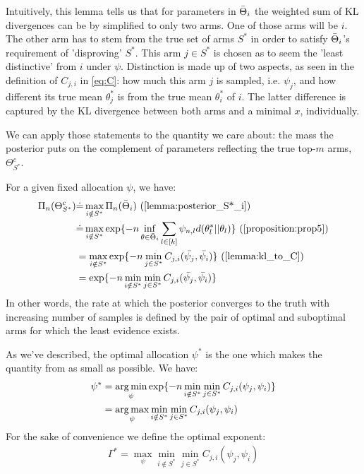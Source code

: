 Intuitively, this lemma tells us that for parameters in $\Bar{\Theta}_i$ the
weighted sum of KL divergences can be by simplified to only two arms. One of
those arms will be $i$. The other arm has to stem from the true set of arms
$S^*$ in order to satisfy $\Bar{\Theta}_i$'s requirement of 'disproving' $S^*$.
This arm $j \in S^*$ is chosen as to seem the 'least distinctive' from $i$ under
$\psi$. Distinction is made up of two aspects, as seen in the definition of
$C_{j, i}$ in \eqref{eq:C}: how much this arm $j$ is sampled, i.e. $\psi_j$, and
how different its true mean $\theta^*_j$ is from the true mean $\theta^*_i$ of
$i$. The latter difference is captured by the KL divergence between both arms
and a minimal $x$, individually.

We can apply those statements to the quantity we care about: the mass the
posterior puts on the complement of parameters reflecting the true top-$m$ arms,
$\Theta_{S^*}^c$.

For a given fixed allocation $\psi$, we have:
\begin{align}
  \Pi_n(\Theta_{S^*}^c) &\deq \max_{i \notin S^*}\Pi_n(\bar{\Theta}_i) \text{ (\Cref{lemma:posterior_S*_i})}\\
    &\deq \max_{i \notin S^*} \exp\{-n\inf_{\theta \in \bar{\Theta}_i} \sum_{l
        \in [k]} \psi_{n, l} d(\theta^*_l || \theta_l)\} \text{
        (\Cref{proposition:prop5})} \\
    &= \max_{i \notin S^*} \exp\{-n \min_{j \in S^*} C_{j, i}(\bar{\psi_j},
        \bar{\psi_i})\} \text{ (\Cref{lemma:kl_to_C})} \\
    &= \exp\{-n \min_{i \notin S^*}\min_{j \in S^*} C_{j, i}(\bar{\psi_j},
        \bar{\psi_i})\} \label{eq:posterior}
\end{align}
In other words, the rate at which the posterior converges to the truth with
increasing number of samples is defined by the pair of optimal and suboptimal
arms for which the least evidence exists.

As we've described, the optimal allocation $\psi^*$ is the one which makes the
quantity from  as small as possible. We have:
\begin{align}
  \psi^* &= \operatorname*{arg\,min}_{\psi} \exp\{-n \min_{i \notin S^*}\min_{j \in
      S^*} C_{j, i}(\psi_j, \psi_i)\} \\
    &= \operatorname*{arg\,max}_{\psi} \min_{i \notin S^*}\min_{j \in S^*} C_{j, i}(\psi_j,
        \psi_i) \label{eq:psi^*}
\end{align}
For the sake of convenience we define the optimal exponent:
\begin{align}
  \Gamma^* = \max_{\psi} \min_{i \notin S^*}\min_{j \in S^*} C_{j, i}(\psi_j,
      \psi_i) \label{eq:gamma^*}
\end{align}

